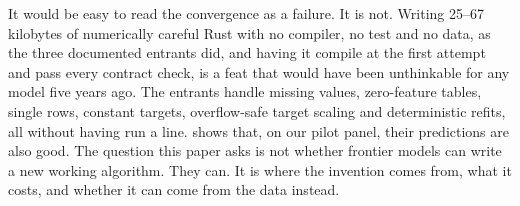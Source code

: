 It would be easy to read the convergence as a failure. It is not. Writing 25--67 kilobytes of
numerically careful Rust with no compiler, no test and no data, as the three documented entrants
did, and having it compile at the first attempt and pass every contract check, is a feat that would have been unthinkable for any
model five years ago. The entrants handle missing values, zero-feature tables, single rows,
constant targets, overflow-safe target scaling and deterministic refits, all without having run
a line.  shows that, on our pilot panel, their predictions are also good. The
question this paper asks is not whether frontier models can write a new working algorithm. They
can. It is where the invention comes from, what it costs, and whether it can come from the data
instead.
